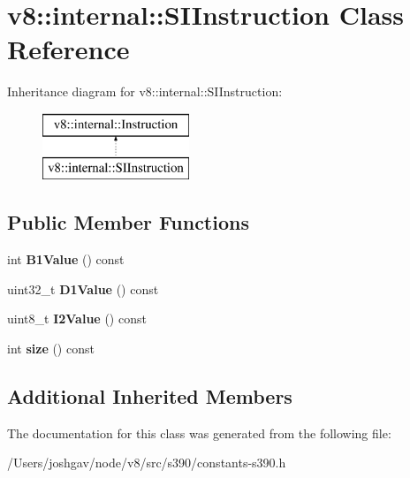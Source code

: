 \hypertarget{classv8_1_1internal_1_1_s_i_instruction}{}\section{v8\+:\+:internal\+:\+:S\+I\+Instruction Class Reference}
\label{classv8_1_1internal_1_1_s_i_instruction}
Inheritance diagram for v8\+:\+:internal\+:\+:S\+I\+Instruction\+:\begin{figure}[H]
\begin{center}
\leavevmode
\includegraphics[height=2.000000cm]{classv8_1_1internal_1_1_s_i_instruction}
\end{center}
\end{figure}
\subsection*{Public Member Functions}
\begin{DoxyCompactItemize}
\item 
int {\bfseries B1\+Value} () const \hypertarget{classv8_1_1internal_1_1_s_i_instruction_a71d546b2de118f8a1b145db3ee69a277}{}\label{classv8_1_1internal_1_1_s_i_instruction_a71d546b2de118f8a1b145db3ee69a277}

\item 
uint32\+\_\+t {\bfseries D1\+Value} () const \hypertarget{classv8_1_1internal_1_1_s_i_instruction_a19756e62e28c2f3edb8a6342293df938}{}\label{classv8_1_1internal_1_1_s_i_instruction_a19756e62e28c2f3edb8a6342293df938}

\item 
uint8\+\_\+t {\bfseries I2\+Value} () const \hypertarget{classv8_1_1internal_1_1_s_i_instruction_ace550a660db69160046c40e9e735a866}{}\label{classv8_1_1internal_1_1_s_i_instruction_ace550a660db69160046c40e9e735a866}

\item 
int {\bfseries size} () const \hypertarget{classv8_1_1internal_1_1_s_i_instruction_a0b56df10213b7bcfadb10ca0cc45a7bd}{}\label{classv8_1_1internal_1_1_s_i_instruction_a0b56df10213b7bcfadb10ca0cc45a7bd}

\end{DoxyCompactItemize}
\subsection*{Additional Inherited Members}


The documentation for this class was generated from the following file\+:\begin{DoxyCompactItemize}
\item 
/\+Users/joshgav/node/v8/src/s390/constants-\/s390.\+h\end{DoxyCompactItemize}

